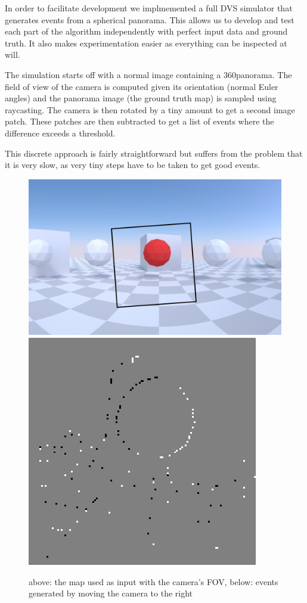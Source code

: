In order to facilitate development we implmemented a full DVS simulator that
generates events from a spherical panorama.  This allows us to develop and test
each part of the algorithm independently with perfect input data and ground
truth. It also makes experimentation easier as everything can be inspected at
will.

The simulation starts off with a normal image containing a 360\textdegree panorama. The field of view of the camera is computed given its orientation (normal Euler angles) and the panorama image (the ground truth map) is sampled using raycasting. The camera is then rotated by a tiny amount to get a second image patch. These patches are then subtracted to get a list of events where the difference exceeds a threshold.

This discrete approach is fairly straightforward but suffers from the problem that it is very slow, as very tiny steps have to be taken to get good events.

\begin{figure}
\label{fig:simulation}
\includegraphics[width=\linewidth]{images/simulation_raw.jpg}
\includegraphics[width=\linewidth]{images/simulation_events.jpg}
\caption{above: the map used as input with the camera's FOV, below: events generated by moving the camera to the right}
\end{figure}
